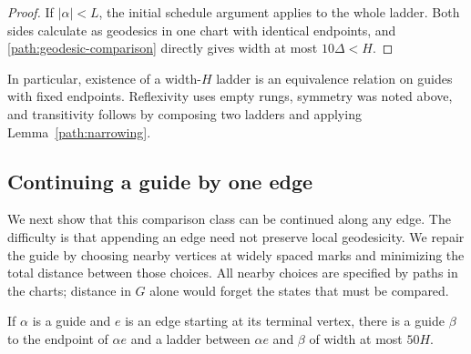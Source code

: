 \begin{proof}
If $|\alpha|<L$, the initial schedule argument applies to the whole
ladder.  Both sides calculate as geodesics in one chart with identical
endpoints, and \eqref{path:geodesic-comparison} directly gives width at
most $10\Delta<H$.
\end{proof}

In particular, existence of a width-$H$ ladder is an equivalence relation
on guides with fixed endpoints.  Reflexivity uses empty rungs, symmetry
was noted above, and transitivity follows by composing two ladders and
applying Lemma~\ref{path:narrowing}.

\subsection{Continuing a guide by one edge}

We next show that this comparison class can be continued along any edge.
The difficulty is that appending an edge need not preserve local
geodesicity.  We repair the guide by choosing nearby vertices at widely
spaced marks and minimizing the total distance between those choices.
All nearby choices are specified by paths in the charts; distance in
$G$ alone would forget the states that must be compared.

\begin{lemma}[Extension]\label{path:extension}
If $\alpha$ is a guide and $e$ is an edge starting at its terminal vertex,
there is a guide $\beta$ to the endpoint of $\alpha e$ and a ladder
between $\alpha e$ and $\beta$ of width at most $50H$.
\end{lemma}

